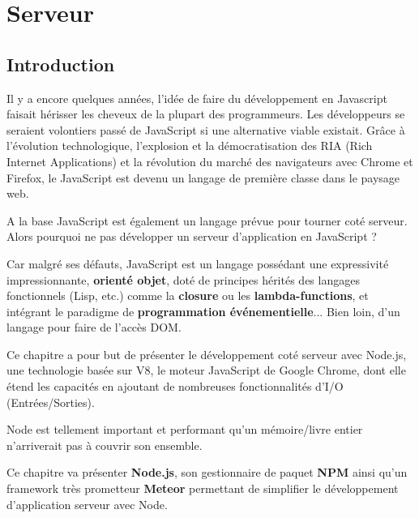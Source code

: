 \chapter{Serveur}

\section{Introduction}
\label{ch:introServeur}



Il y a encore quelques années, l’idée de faire du développement en Javascript faisait hérisser les cheveux de la plupart des programmeurs. Les développeurs se seraient volontiers passé de JavaScript si une alternative viable existait. Grâce à l'évolution technologique, l'explosion et la démocratisation des RIA (Rich Internet Applications) et la révolution du marché des navigateurs avec Chrome et Firefox, le JavaScript est devenu un langage de première classe dans le paysage web.

A la base JavaScript est également un langage prévue pour tourner coté serveur. Alors pourquoi ne pas développer un serveur d’application en JavaScript ?

Car malgré ses défauts, JavaScript est un langage possédant une expressivité impressionnante, \textbf{orienté objet}, doté de principes hérités des langages fonctionnels (Lisp, etc.) comme la \textbf{closure} ou les \textbf{lambda-functions}, et intégrant le paradigme de \textbf{programmation événementielle}... Bien loin, d’un langage pour faire de l’accès DOM. 

Ce chapitre a pour but de présenter le développement coté serveur avec  Node.js, une technologie basée sur V8, le moteur JavaScript de Google Chrome, dont elle étend les capacités en ajoutant de nombreuses fonctionnalités d'I/O (Entrées/Sorties).

Node est tellement important et performant qu’un mémoire/livre entier n’arriverait pas à couvrir son ensemble.

Ce chapitre va présenter \textbf{Node.js}, son gestionnaire de paquet \textbf{NPM} ainsi qu'un framework très prometteur \textbf{Meteor} permettant de simplifier le développement d’application serveur avec Node.
